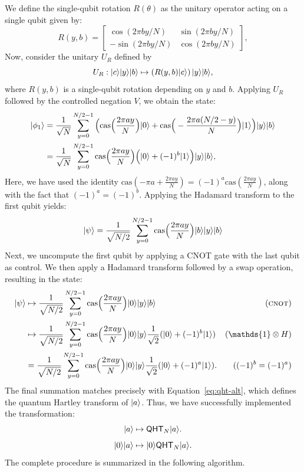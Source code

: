 \documentclass[12pt]{report}
\newcommand{\cas}{\mathrm{cas}}
\newcommand{\qht}{\mathsf{QHT}}
\begin{document}
We define the single-qubit rotation \( R(\theta) \) as the unitary operator acting on a single qubit given by:
\begin{equation}
    \label{eq:sine-rot}
    R(y, b) = 
    \begin{bmatrix}
        \cos(2\pi b y / N) & \sin(2\pi b y / N) \\
        -\sin(2\pi b y / N) & \cos(2\pi b y / N)
    \end{bmatrix},
\end{equation}
Now, consider the unitary \( U_R \) defined by
\[
U_R : \lvert c\rangle\lvert y\rangle\lvert b\rangle \mapsto \left(R(y, b)\lvert c\rangle\right)\lvert y\rangle\lvert b\rangle,
\]
where \( R(y, b) \) is a single-qubit rotation depending on \( y \) and \( b \). Applying \( U_R \) followed by the controlled negation \( V \), we obtain the state:
\begin{align*}
    \ket{\phi_1}
    & = \frac{1}{\sqrt{N}} \sum_{y = 0}^{N / 2 - 1} \Big( \cas\Big( \frac{2\pi ay}{N} \Big) \ket{0} + \cas\Big(-\frac{2\pi a(N /2 - y)}{N} \Big) \ket{1} \Big) \ket{y} \ket{b} \\
    & = \frac{1}{\sqrt{N}} \sum_{y = 0}^{N / 2 - 1} \cas\Big( \frac{2\pi ay}{N} \Big) \Big( \ket{0} + (-1)^b \ket{1} \Big) \ket{y} \ket{b},
\end{align*}
Here, we have used the identity \( \cas\left(-\pi a + \frac{2\pi a y}{N}\right) = (-1)^a \cas\left(\frac{2\pi a y}{N}\right) \), along with the fact that \( (-1)^a = (-1)^b \). Applying the Hadamard transform to the first qubit yields:
\[
    \ket{\psi} = \frac{1}{\sqrt{N / 2}} \sum_{y = 0}^{N / 2 - 1} \cas\Big( \frac{2\pi ay}{N} \Big) \ket{b} \ket{y} \ket{b}
\]
Next, we uncompute the first qubit by applying a \textsc{CNOT} gate with the last qubit as control. We then apply a Hadamard transform followed by a swap operation, resulting in the state:
\begin{align*}
    \ket{\psi}
    & \mapsto \frac{1}{\sqrt{N / 2}} \sum_{y = 0}^{N / 2 - 1} \cas\Big( \frac{2\pi ay}{N} \Big) \ket{0} \ket{y} \ket{b} & (\textsc{cnot}) \\
    & \mapsto \frac{1}{\sqrt{N / 2}} \sum_{y = 0}^{N / 2 - 1} \cas\Big( \frac{2\pi ay}{N} \Big) \ket{0} \ket{y} \frac{1}{\sqrt{2}}(\ket{0} + (-1)^b \ket{1}) & (\mathds{1} \otimes H) \\
    & = \frac{1}{\sqrt{N / 2}} \sum_{y = 0}^{N / 2 - 1} \cas\Big( \frac{2\pi ay}{N} \Big) \ket{0} \ket{y} \frac{1}{\sqrt{2}}(\ket{0} + (-1)^a \ket{1}). & ((-1)^b = (-1)^a) \\
\end{align*}
The final summation matches precisely with Equation~\eqref{eq:qht-alt}, which defines the quantum Hartley transform of \( \lvert a\rangle \). Thus, we have successfully implemented the transformation:
\[
\ket{a} \mapsto \qht_N \ket{a}.
\]
\[ \ket{0}\ket{a} \mapsto \ket{0} \qht_N\ket{a}. \]
The complete procedure is summarized in the following algorithm.
\end{document}
